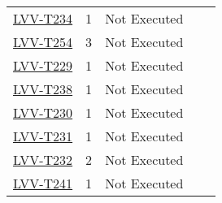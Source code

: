 \documentclass[SE,lsstdraft,STR,toc]{lsstdoc}
\begin{document}
{\begin{longtable}{p{2cm}cp{2.3cm}p{8.6cm}p{2.3cm}}
\begin{minipage}[]{9cm}
\medskip
\end{minipage}
&
\\\hline
\href{https://jira.lsstcorp.org/secure/Tests.jspa#/testCase/LVV-T234}{LVV-T234}
&  1
& Not Executed &
\begin{minipage}[]{9cm}
\smallskip

\medskip
\end{minipage}
&
\\\hline
\href{https://jira.lsstcorp.org/secure/Tests.jspa#/testCase/LVV-T254}{LVV-T254}
&  3
& Not Executed &
\begin{minipage}[]{9cm}
\smallskip

\medskip
\end{minipage}
&
\\\hline
\href{https://jira.lsstcorp.org/secure/Tests.jspa#/testCase/LVV-T229}{LVV-T229}
&  1
& Not Executed &
\begin{minipage}[]{9cm}
\smallskip

\medskip
\end{minipage}
&
\\\hline
\href{https://jira.lsstcorp.org/secure/Tests.jspa#/testCase/LVV-T238}{LVV-T238}
&  1
& Not Executed &
\begin{minipage}[]{9cm}
\smallskip

\medskip
\end{minipage}
&
\\\hline
\href{https://jira.lsstcorp.org/secure/Tests.jspa#/testCase/LVV-T230}{LVV-T230}
&  1
& Not Executed &
\begin{minipage}[]{9cm}
\smallskip

\medskip
\end{minipage}
&
\\\hline
\href{https://jira.lsstcorp.org/secure/Tests.jspa#/testCase/LVV-T231}{LVV-T231}
&  1
& Not Executed &
\begin{minipage}[]{9cm}
\smallskip

\medskip
\end{minipage}
&
\\\hline
\href{https://jira.lsstcorp.org/secure/Tests.jspa#/testCase/LVV-T232}{LVV-T232}
&  2
& Not Executed &
\begin{minipage}[]{9cm}
\smallskip

\medskip
\end{minipage}
&
\\\hline
\href{https://jira.lsstcorp.org/secure/Tests.jspa#/testCase/LVV-T241}{LVV-T241}
&  1
& Not Executed &
\begin{minipage}[]{9cm}
\smallskip


\end{minipage}
\end{longtable}}
\end{document}
